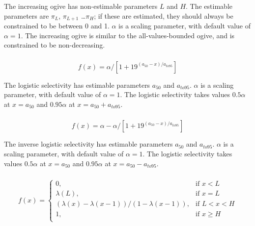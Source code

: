 The increasing ogive has non-estimable parameters $L$ and $H$. The estimable parameters are $\pi_L$, $\pi_{L+1}$ \ldots $\pi_H$; if these are estimated, they should always be constrained to be between 0 and 1. $\alpha$ is a scaling parameter, with default value of $\alpha = 1$. The increasing ogive is similar to the all-values-bounded ogive, and is constrained to be non-decreasing.

\subsubsection[Logistic]{}

\begin{equation}
  f(x) = \alpha / [1+19^{(a_{50}-x)/a_{to95}}]
\end{equation}

The logistic selectivity has estimable parameters $a_{50}$ and $a_{to95}$. $\alpha$ is a scaling parameter, with default value of $\alpha = 1$. The logistic selectivity takes values $0.5 \alpha$ at $x=a_{50}$ and $0.95 \alpha$ at $x=a_{50}+a_{to95}$.

\subsubsection[Inverse logistic]{}

\begin{equation}
  f(x) = \alpha - \alpha / [1+19^{(a_{50}-x)/a_{to95}}]
\end{equation}

The inverse logistic selectivity has estimable parameters $a_{50}$ and $a_{to95}$. $\alpha$ is a scaling parameter, with default value of $\alpha = 1$. The logistic selectivity takes values $0.5 \alpha$ at $x=a_{50}$ and $0.95 \alpha$ at $x=a_{50}-a_{to95}$.

\subsubsection[Logistic producing]{}

\begin{equation}
f(x)=\begin{cases}
	  0, & \text{if $x < L$} \\
	  \lambda(L), & \text{if $x=L$} \\
	  \left( \lambda(x)-\lambda(x-1) \right) / \left( 1-\lambda(x-1) \right), & \text{if $L < x < H$} \\
	  1, & \text{if $x \ge H$} \\
  \end{cases}
\end{equation}

